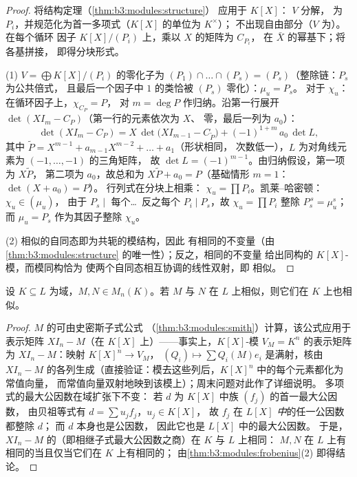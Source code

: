 \begin{proof}
将结构定理（\cref{thm:b3:modules:structure}）
应用于 $K[X]$： $V$ 分解，
为 $P_i$，并规范化为首一多项式（$K[X]$ 的单位为 $K^\times$）；
不出现自由部分（$V$ 为）。在每个循环
因子 $K[X]/(P_i)$ 上，乘以 $X$ 的矩阵为 $C_{P_i}$，
在 $\bar X$ 的幂基下；将各基拼接，
即得分块形式。

(1) $V = \bigoplus K[X]/(P_i)$ 的零化子为 $(P_1)\cap
\dots\cap(P_s) = (P_s)$（整除链：$P_s$ 为公共倍式，
且最后一个因子中 $1$ 的类恰被 $(P_s)$ 零化）：$\mu_u = P_s$。
对于 $\chi_u$：在循环因子上，$\chi_{C_P} = P$，
对 $m = \deg P$ 作归纳。沿第一行展开
$\det(XI_m - C_P)$（第一行的元素依次为 $X$、
零，最后一列为 $a_0$）：
\[
\det(XI_m - C_P) = X\,\det\bigl(XI_{m-1} - C_{\tilde P}\bigr)
+ (-1)^{1+m}\,a_0\,\det L ,
\]
其中 $\tilde P = X^{m-1} + a_{m-1}X^{m-2} + \dots + a_1$（形状相同，
次数低一），$L$ 为对角线元素为 $(-1, \dots, -1)$ 的三角矩阵，
故 $\det L = (-1)^{m-1}$。由归纳假设，第一项为 $X\tilde P$，
第二项为 $a_0$，故总和为
$X\tilde P + a_0 = P$（基础情形 $m=1$：$\det(X + a_0) = P$）。
行列式在分块上相乘：
$\chi_u = \prod P_i$。凯莱–哈密顿：$\chi_u \in (\mu_u)$，
由于 $P_s \mid$ 每个\dots\ 反之每个 $P_i \mid P_s$，故
$\chi_u = \prod P_i$ 整除 $P_s^{\,s} = \mu_u^s$；而 $\mu_u =
P_s$ 作为其因子整除 $\chi_u$。

(2) 相似的自同态即为共轭的模结构，因此
有相同的不变量（由
\cref{thm:b3:modules:structure} 的唯一性）；反之，相同的不变量
给出同构的 $K[X]$-模，而模同构恰为
使两个自同态相互协调的线性双射，即
相似。
\end{proof}

\begin{corollary}[相似性对域扩张不敏感]
\label{cor:b3:modules:descent}
设 $K \subseteq L$ 为域，$M, N \in M_n(K)$。若 $M$ 与
$N$ 在 $L$ 上相似，则它们在 $K$ 上也相似。
\end{corollary}

\begin{proof}
$M$ 的可由史密斯子式公式
（\cref{thm:b3:modules:smith}）计算，该公式应用于表示矩阵
$XI_n - M$（在 $K[X]$ 上）——事实上，$K[X]$-模
$V_M = K^n$ 的表示矩阵为 $XI_n - M$：映射 $K[X]^n \to V_M$，
$(Q_i) \mapsto \sum Q_i(M)e_i$ 是满射，核由
$XI_n - M$ 的各列生成（直接验证：模去这些列后，$K[X]^n$ 中的每个元素都化为常值向量，
而常值向量双射地映到该模上）；周末问题对此作了详细说明。
多项式的最大公因数在域扩张下不变：
若 $d$ 为 $K[X]$ 中族 $(f_j)$ 的首一最大公因数，
由贝祖等式有 $d = \sum u_jf_j$，$u_j \in K[X]$，
故 $f_j$ 在 \emph{$L[X]$ 中}的任一公因数都整除 $d$；
而 $d$ 本身也是公因数，
因此它也是 $L[X]$ 中的最大公因数。
于是，$XI_n - M$ 的（即相继子式最大公因数之商）在
$K$ 与 $L$ 上相同：
$M, N$ 在 $L$ 上有相同的当且仅当它们在 $K$ 上有相同的；
由\cref{thm:b3:modules:frobenius}(2) 即得结论。
\end{proof}

